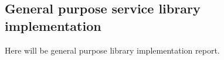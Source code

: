 \newpage
\subsection{General purpose service library implementation}
Here will be general purpose library implementation report.